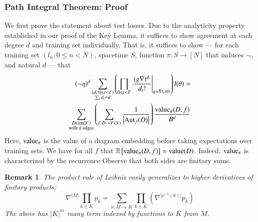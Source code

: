 \documentclass{article}
\newtheorem{rmk}{Remark}
\newcommand{\Free}{\mathcal{F}}
\newcommand{\Aut}{\text{\textnormal{Aut}}}
\newcommand{\image}{\text{\textnormal{im}}}
\newcommand{\dvalue}{\text{\textnormal{value}}}
\newcommand{\expct}[1]{\mathbb{E}\left[#1\right]}
\newcommand{\wrap}[1]{\left(#1\right)}
\newcommand{\wabs}[1]{\left|#1\right|}
\begin{document}
        \subsubsection*{Path Integral Theorem: Proof}
            We first prove the statement about test losses.
            Due to the analyticity property established in our proof of the
            Key Lemma, it suffices to show agreement at each degree $d$ and
            training set individually.  That is, it suffices to show --- for
            each training set $(l_n: 0\leq n<N)$, spacetime $S$, function $\pi:
            S\to [N]$ that induces $\sim$, and natural $d$ --- that
            \begin{align} \label{eq:toprove}
                (-\eta)^d
                \sum_{\substack{
                    (d_t: 0\leq t<T) \\
                    \sum_t d_t = d
                }}
                \wrap{
                    \prod_{0 \leq t < T} \left.
                        \frac{(g \nabla)^{d_t}}{d_t!}
                    \right|_{g=\nabla l_t(\theta)}
                } l (\theta)
                = \nonumber \\
                \sum_{\substack{
                    D \in \image(\Free) \\
                    \textnormal{with $d$ edges}
                }}
                \wrap{
                    \sum_{f: D\to\Free(S)}
                    \frac{1}{\wabs{\Aut_f(D)}}
                }
                \frac{\dvalue_\pi(D, f)}{B^{d}}
            \end{align}
            Here, $\dvalue_\pi$ is the value of a diagram embedding before
            taking expectations over training sets.  We have for all $f$ that
            $\expct{\dvalue_\pi(D, f)} = \dvalue(D)$.  Indeed, $\dvalue_\pi$ 
            is characterized by the recurrence
            Observe that both sides are finitary sums.

            \begin{rmk}
                The product rule of Leibniz easily generalizes to higher
                derivatives of finitary products:
                $$
                    \nabla^{\wabs{M}} \prod_{k \in K} p_k
                    = 
                    \sum_{\nu:M\to K} \prod_{k\in K} \wrap{
                        \nabla^{\wabs{\nu^{-1}(k)}} p_k
                    }
                $$
                The above has $\wabs{K}^m$ many term indexed by functions to
                $K$ from $M$.
            \end{rmk}
\end{document}
